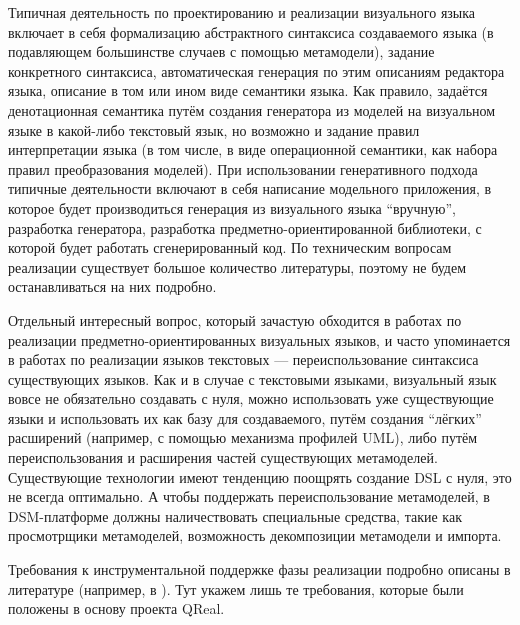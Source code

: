 Типичная деятельность по проектированию и реализации визуального языка включает в себя 
формализацию абстрактного синтаксиса создаваемого языка (в подавляющем большинстве случаев 
с помощью метамодели), задание конкретного синтаксиса, автоматическая генерация по этим 
описаниям редактора языка, описание в том или ином виде семантики языка. Как правило, 
задаётся денотационная семантика путём создания генератора из моделей на визуальном языке 
в какой-либо текстовый язык, но возможно и задание правил интерпретации языка (в том числе, 
в виде операционной семантики, как набора правил преобразования моделей). При использовании 
генеративного подхода типичные деятельности включают в себя написание модельного приложения, 
в которое будет производиться генерация из визуального языка "`вручную"', разработка генератора, 
разработка предметно-ориентированной библиотеки, с которой будет работать сгенерированный код. 
По техническим вопросам реализации существует большое количество литературы, поэтому 
не будем останавливаться на них подробно.

Отдельный интересный вопрос, который зачастую обходится в работах по реализации предметно-ориентированных 
визуальных языков, и часто упоминается в работах по реализации языков текстовых --- переиспользование 
синтаксиса существующих языков. Как и в случае с текстовыми языками, визуальный язык 
вовсе не обязательно создавать с нуля, можно использовать уже существующие языки и 
использовать их как базу для создаваемого, путём создания "`лёгких"' расширений (например, 
с помощью механизма профилей UML), либо путём переиспользования и расширения частей 
существующих метамоделей. Существующие технологии имеют тенденцию поощрять создание DSL с нуля, 
это не всегда оптимально. А чтобы поддержать переиспользование метамоделей, в DSM-платформе 
должны наличествовать специальные средства, такие как просмотрщики метамоделей, возможность 
декомпозиции метамодели и импорта.

Требования к инструментальной поддержке фазы реализации подробно описаны в литературе 
(например, в \cite{kelly2008domain}). Тут укажем лишь те требования, которые были 
положены в основу проекта QReal.

